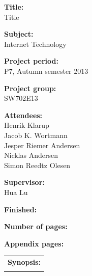 \begin{titlingpage}
\begin{nopagebreak}
{\noindent\begin{minipage}[c]{0.4\textwidth}
	\begin{flushleft} 
	\begin{description}	
\item {\textbf{Title:}}\\
Title
\item {\textbf{Subject:}}\\
Internet Technology
\item {\textbf{Project period:}}\\
   P7, Autumn semester 2013\\
  \hspace{4cm}
\item {\textbf{Project group:}}\\
  SW702E13\\
  \hspace{4cm}
\item {\textbf{Attendees:}}\\
Henrik Klarup \\
Jacob K. Wortmann \\
Jesper Riemer Andersen \\
Nicklas Andersen \\
Simon Reedtz Olesen \\

\item {\textbf{Supervisor:}}\\
Hua Lu \\
\end{description}

\begin{description}
\item {\textbf{Finished:}}
\item {\textbf{Number of pages:}} \pageref{lastpage}
\item {\textbf{Appendix pages:}} 
\end{description}
\vfill
	\end{flushleft}
\end{minipage}
\begin{minipage}[c]{0.6\textwidth}
	\begin{flushright} 
		  \vspace{.15cm}
  \hfill 
  \begin{tabular}{l}
  {\textbf{Synopsis:}}\bigskip \\
  \fbox{
    \parbox{5.5cm}{\bigskip
     {\vfill{\small 
     \bigskip}}
     }}
   \end{tabular}
	\end{flushright}
\end{minipage}

}
\end{nopagebreak}
\end{titlingpage}
